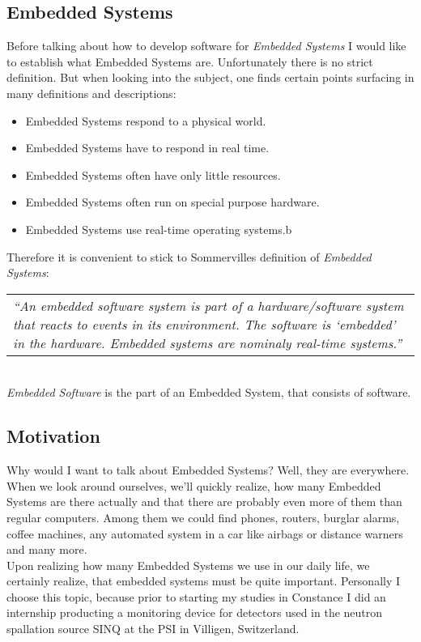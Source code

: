 \documentclass[10pt,a4paper,titlepage,draft]{report} %
\begin{document}
\subsection{Embedded Systems}
Before talking about how to develop software for \emph{Embedded Systems} I would like to establish what Embedded Systems are.
Unfortunately there is no strict definition.
But when looking into the subject, one finds certain points surfacing in many definitions and descriptions:
\begin{itemize}
	\item Embedded Systems respond to a physical world.
	\item Embedded Systems have to respond in real time.
	\item Embedded Systems often have only little resources.
	\item Embedded Systems often run on special purpose hardware.
	\item Embedded Systems use real-time operating systems.b
\end{itemize}
Therefore it is convenient to stick to Sommervilles definition of \emph{Embedded Systems}:
\\
\hspace*{2em}
\begin{tabular}{p{10.5cm}}
\textit{``An \emph{embedded software system} is part of a hardware/software system that reacts to events in its environment.
The software is ‘embedded’ in the hardware.
Embedded systems are nominaly real-time systems.''}
\cite[p. 561]{sommerville}
\end{tabular}
\\
\emph{Embedded Software} is the part of an Embedded System, that consists of software.
\subsection{Motivation}
Why would I want to talk about Embedded Systems?
Well, they are everywhere. When we look around ourselves, we'll quickly realize, how many Embedded Systems are there actually and that there are probably even more of them than regular computers.
Among them we could find phones, routers, burglar alarms, coffee machines, any automated system in a car like airbags or distance warners and many more.\\
Upon realizing how many Embedded Systems we use in our daily life, we certainly realize, that embedded systems must be quite important.
Personally I choose this topic, because prior to starting my studies in Constance I did an internship producting a monitoring device for detectors used in the neutron spallation source SINQ at the PSI in Villigen, Switzerland.
\end{document}
